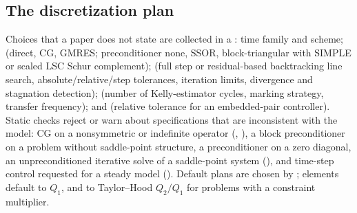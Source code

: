 \subsection{The discretization plan}
Choices that a paper does not state are collected in a : time family and scheme;  (direct, CG, GMRES; preconditioner none, SSOR, block-triangular with SIMPLE or scaled LSC Schur complement);  (full step or residual-based backtracking line search, absolute/relative/step tolerances, iteration limits, divergence and stagnation detection);  (number of Kelly-estimator cycles, marking strategy, transfer frequency); and  (relative tolerance for an embedded-pair controller). Static checks reject or warn about specifications that are inconsistent with the model: CG on a nonsymmetric or indefinite operator (, ), a block preconditioner on a problem without saddle-point structure, a preconditioner on a zero diagonal, an unpreconditioned iterative solve of a saddle-point system (), and time-step control requested for a steady model (). Default plans are chosen by ; elements default to $Q_1$, and to Taylor--Hood $Q_2/Q_1$ for problems with a constraint multiplier.
